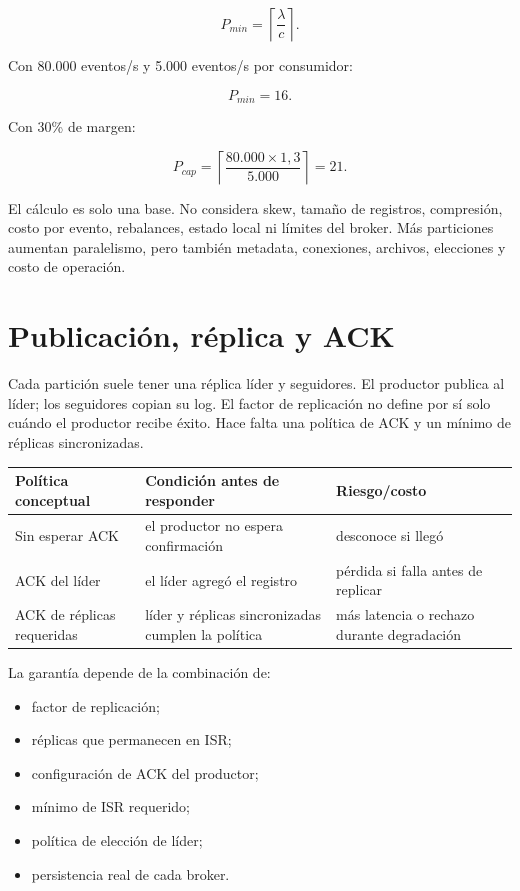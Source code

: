 \documentclass[variant=apuntes,cover=institutional,mode=screen]{ua-engineering-v6-article}
\begin{document}
\[
P_{min}=\left\lceil \frac{\lambda}{c}\right\rceil.
\]

Con 80.000 eventos/s y 5.000 eventos/s por consumidor:

\[
P_{min}=16.
\]

Con 30\% de margen:

\[
P_{cap}=\left\lceil\frac{80.000\times1{,}3}{5.000}\right\rceil=21.
\]

El cálculo es solo una base. No considera skew, tamaño de registros, compresión, costo por evento, rebalances, estado local ni límites del broker. Más particiones aumentan paralelismo, pero también metadata, conexiones, archivos, elecciones y costo de operación.

\section{Publicación, réplica y ACK}

Cada partición suele tener una réplica líder y seguidores. El productor publica al líder; los seguidores copian su log. El factor de replicación no define por sí solo cuándo el productor recibe éxito. Hace falta una política de ACK y un mínimo de réplicas sincronizadas.

\begin{center}
\begin{tabular}{p{}p{}p{}}
\toprule
Política conceptual & Condición antes de responder & Riesgo/costo \\
\midrule
Sin esperar ACK & el productor no espera confirmación & desconoce si llegó \\
ACK del líder & el líder agregó el registro & pérdida si falla antes de replicar \\
ACK de réplicas requeridas & líder y réplicas sincronizadas cumplen la política & más latencia o rechazo durante degradación \\
\bottomrule
\end{tabular}
\end{center}

La garantía depende de la combinación de:

\begin{itemize}
\item factor de replicación;
\item réplicas que permanecen en ISR;
\item configuración de ACK del productor;
\item mínimo de ISR requerido;
\item política de elección de líder;
\item persistencia real de cada broker.
\end{itemize}
\end{document}
